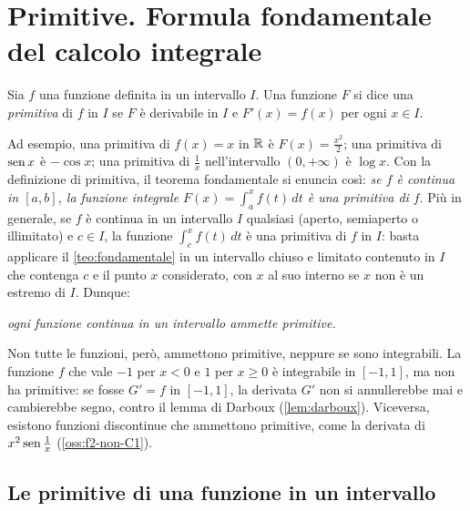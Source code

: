 \section{Primitive. Formula fondamentale del calcolo integrale}
\label{sec:primitive}

\begin{definizione}[Primitiva]\label{def:primitiva}
Sia $f$ una funzione definita in un intervallo $I$. Una funzione $F$ si dice una
\emph{primitiva} di $f$ in $I$ se $F$ è derivabile in $I$ e $F'(x)=f(x)$ per ogni $x\in I$.
\end{definizione}

Ad esempio, una primitiva di $f(x)=x$ in $\mathbb{R}$ è $F(x)=\frac{x^{2}}2$; una primitiva di
$\operatorname{sen} x$ è $-\cos x$; una primitiva di $\frac1x$ nell'intervallo $(0,+\infty)$ è $\log x$.
Con la definizione di primitiva, il teorema fondamentale si enuncia così: \emph{se $f$ è
continua in $[a,b]$, la funzione integrale $F(x)=\int_{a}^{x}f(t)\,dt$ è una primitiva di
$f$}. Più in generale, se $f$ è continua in un intervallo $I$ qualsiasi (aperto,
semiaperto o illimitato) e $c\in I$, la funzione $\int_{c}^{x}f(t)\,dt$ è una primitiva di
$f$ in $I$: basta applicare il \cref{teo:fondamentale} in un intervallo chiuso e
limitato contenuto in $I$ che contenga $c$ e il punto $x$ considerato, con $x$ al suo
interno se $x$ non è un estremo di $I$. Dunque:

\begin{center}
\emph{ogni funzione continua in un intervallo ammette primitive.}
\end{center}

Non tutte le funzioni, però, ammettono primitive, neppure se sono integrabili. La
funzione $f$ che vale $-1$ per $x<0$ e $1$ per $x\ge0$ è integrabile in $[-1,1]$, ma non ha
primitive: se fosse $G'=f$ in $[-1,1]$, la derivata $G'$ non si annullerebbe mai e
cambierebbe segno, contro il lemma di Darboux (\cref{lem:darboux}). Viceversa, esistono
funzioni discontinue che ammettono primitive, come la derivata di $x^{2}\operatorname{sen}\frac1x$
(\cref{oss:f2-non-C1}).

\subsection{Le primitive di una funzione in un intervallo}


